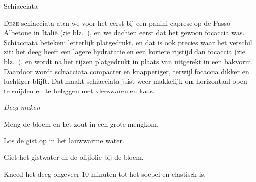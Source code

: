 \begin{recipe}{Schiacciata}
\label{recipe:schiacciata}


\lettrine{D}{eze} schiacciata aten we voor het eerst bij een panini caprese op
de Passo Albetone in Italië (zie blz.~\pageref{recipe:panini-caprese}), en we
dachten eerst dat het gewoon focaccia was. Schiacciata betekent letterlijk
platgedrukt, en dat is ook precies waar het verschil zit: het deeg heeft een
lagere hydratatie en een kortere rijstijd dan focaccia (zie
blz.~\pageref{recipe:focaccia}), en wordt na het rijzen platgedrukt in plaats
van uitgerekt in een bakvorm. Daardoor wordt schiacciata compacter en
knapperiger, terwijl focaccia dikker en luchtiger blijft. Dat maakt
schiacciata juist weer makkelijk om horizontaal open te snijden en te
beleggen met vleeswaren en kaas.

\begin{ingredients}
\end{ingredients}


\medskip
\noindent\textit{Deeg maken}
\begin{steps}
  \item Meng de bloem en het zout in een grote mengkom.
  \item Los de gist op in het lauwwarme water.
  \item Giet het gistwater en de olijfolie bij de bloem.
  \item Kneed het deeg ongeveer 10 minuten tot het soepel en elastisch is.
\end{steps}


\end{recipe}
